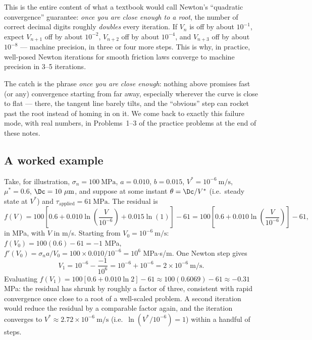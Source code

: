 This is the entire content of what a textbook would call Newton's ``quadratic convergence'' guarantee: \emph{once you are close enough to a root}, the number of correct decimal digits roughly \emph{doubles} every iteration. If $V_n$ is off by about $10^{-1}$, expect $V_{n+1}$ off by about $10^{-2}$, $V_{n+2}$ off by about $10^{-4}$, and $V_{n+3}$ off by about $10^{-8}$ --- machine precision, in three or four more steps. This is why, in practice, well-posed Newton iterations for smooth friction laws converge to machine precision in 3--5 iterations.

The catch is the phrase \emph{once you are close enough}: nothing above promises fast (or any) convergence starting from far away, especially wherever the curve is close to flat --- there, the tangent line barely tilts, and the ``obvious'' step can rocket past the root instead of homing in on it. We come back to exactly this failure mode, with real numbers, in Problems~1--3 of the practice problems at the end of these notes.

\subsection{A worked example}

Take, for illustration, $\sigma_n = 100\ \mathrm{MPa}$, $a = 0.010$, $b = 0.015$, $V^\ast = 10^{-6}\ \mathrm{m/s}$, $\mu^\ast = 0.6$, $\Dc = 10\ \mu\mathrm{m}$, and suppose at some instant $\theta = \Dc/V^\ast$ (i.e.\ steady state at $V^\ast$) and $\tau_{\mathrm{applied}} = 61\ \mathrm{MPa}$. The residual is
\begin{equation}
f(V) = 100\left[0.6 + 0.010\ln\!\left(\frac{V}{10^{-6}}\right) + 0.015 \ln(1)\right] - 61 = 100\left[0.6 + 0.010\ln\!\left(\frac{V}{10^{-6}}\right)\right] - 61,
\end{equation}
in MPa, with $V$ in m/s. Starting from $V_0 = 10^{-6}\ \mathrm{m/s}$: $f(V_0) = 100(0.6) - 61 = -1$ MPa, $f'(V_0) = \sigma_n a / V_0 = 100 \times 0.010 / 10^{-6} = 10^6$ MPa$\cdot$s/m. One Newton step gives
\begin{equation}
V_1 = 10^{-6} - \frac{-1}{10^6} = 10^{-6} + 10^{-6} = 2\times 10^{-6}\ \mathrm{m/s}.
\end{equation}
Evaluating $f(V_1) = 100[0.6 + 0.010\ln 2] - 61 \approx 100(0.6069) - 61 \approx -0.31$ MPa: the residual has shrunk by roughly a factor of three, consistent with rapid convergence once close to a root of a well-scaled problem. A second iteration would reduce the residual by a comparable factor again, and the iteration converges to $V^\ast \approx 2.72\times 10^{-6}\ \mathrm{m/s}$ (i.e.\ $\ln(V^\ast/10^{-6}) = 1$) within a handful of steps.

